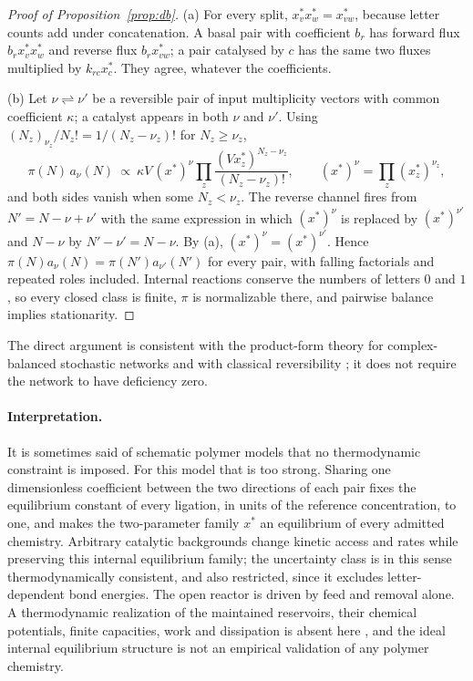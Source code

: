 \documentclass[11pt,letterpaper]{article}
\theoremstyle{plain}
\theoremstyle{definition}
\theoremstyle{remark}
\numberwithin{equation}{section}
\begin{document}
\begin{proof}[Proof of Proposition~\ref{prop:db}]
(a) For every split, $x^*_vx^*_w=x^*_{vw}$, because letter counts add under concatenation. A basal pair with coefficient $b_r$ has forward flux $b_rx^*_vx^*_w$ and reverse flux $b_rx^*_{vw}$; a pair catalysed by $c$ has the same two fluxes multiplied by $k_{rc}x^*_c$. They agree, whatever the coefficients.

(b) Let $\nu\rightleftharpoons\nu'$ be a reversible pair of input multiplicity vectors with common coefficient $\kappa$; a catalyst appears in both $\nu$ and $\nu'$. Using $(N_z)_{\nu_z}/N_z!=1/(N_z-\nu_z)!$ for $N_z\ge\nu_z$,
\[
 \pi(N)\,a_\nu(N)\ \propto\ \kappa V\,(x^*)^{\nu}\prod_z\frac{(Vx^*_z)^{N_z-\nu_z}}{(N_z-\nu_z)!},\qquad (x^*)^\nu=\prod_z(x^*_z)^{\nu_z},
\]
and both sides vanish when some $N_z<\nu_z$. The reverse channel fires from $N'=N-\nu+\nu'$ with the same expression in which $(x^*)^{\nu}$ is replaced by $(x^*)^{\nu'}$ and $N-\nu$ by $N'-\nu'=N-\nu$. By (a), $(x^*)^\nu=(x^*)^{\nu'}$. Hence $\pi(N)a_\nu(N)=\pi(N')a_{\nu'}(N')$ for every pair, with falling factorials and repeated roles included. Internal reactions conserve the numbers of letters $0$ and $1$, so every closed class is finite, $\pi$ is normalizable there, and pairwise balance implies stationarity.
\end{proof}
The direct argument is consistent with the product-form theory for complex-balanced stochastic networks \cite{anderson2010product} and with classical reversibility \cite{kelly1979reversibility}; it does not require the network to have deficiency zero.

\paragraph{Interpretation.}
It is sometimes said of schematic polymer models that no thermodynamic constraint is imposed. For this model that is too strong. Sharing one dimensionless coefficient between the two directions of each pair fixes the equilibrium constant of every ligation, in units of the reference concentration, to one, and makes the two-parameter family $x^*$ an equilibrium of every admitted chemistry. Arbitrary catalytic backgrounds change kinetic access and rates while preserving this internal equilibrium family; the uncertainty class is in this sense thermodynamically consistent, and also restricted, since it excludes letter-dependent bond energies. The open reactor is driven by feed and removal alone. A thermodynamic realization of the maintained reservoirs, their chemical potentials, finite capacities, work and dissipation is absent here \cite{rao2016nonequilibrium}, and the ideal internal equilibrium structure is not an empirical validation of any polymer chemistry.
\end{document}
